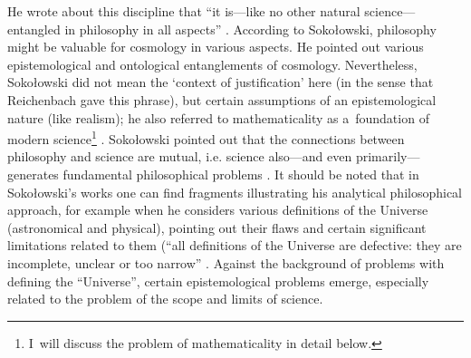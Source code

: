\documentclass[%
  manuscript=article,
  year=2024,
  volume=77,
  doi=00000.000,
]{zfn}
\begin{document}
He wrote about this discipline that ``it is---like no other natural science---entangled in philosophy in all aspects''
\parencite[][p.226]{Sokoowski2017Kopoty}. %
 According to Sokołowski, philosophy might be valuable for cosmology in various aspects. He pointed out various epistemological and ontological entanglements of cosmology. Nevertheless, Sokołowski did not mean the ‘context of justification' here (in the sense that Reichenbach gave this phrase), but certain assumptions of an epistemological nature (like realism); he also referred to mathematicality as a~foundation of modern science\footnote{I~will discuss the problem of mathematicality in detail below. } 
\parencite[][p.181]{Sokoowski2014Czy}. %
 Sokołowski pointed out that the connections between philosophy and science are mutual, i.e. science also---and even primarily---generates fundamental philosophical problems 
\parencite[][p.56]{Sokoowski2015Granice}. %
 It should be noted that in Sokołowski's works one can find fragments illustrating his analytical philosophical approach, for example when he considers various definitions of the Universe (astronomical and physical), pointing out their flaws and certain significant limitations related to them (``all definitions of the Universe are defective: they are incomplete, unclear or too narrow''
\parencite[][p.235]{Sokoowski2017Kopoty}. %
 Against the background of problems with defining the ``Universe'', certain epistemological problems emerge, especially related to the problem of the scope and limits of science.
\end{document}
